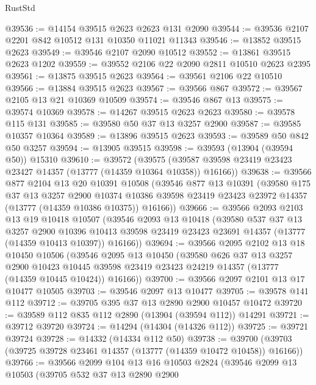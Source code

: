 \begin{lexlean}{RustStd}
\begin{coremodule}
@39536 := @14154 @39515 @2623 @2623 @131 @2090
@39544 := @39536 @2107 @2201 @842 @10512 @131 @10350 @11021 @11343
@39546 := @13852 @39515 @2623
@39549 := @39546 @2107 @2090 @10512
@39552 := @13861 @39515 @2623 @1202
@39559 := @39552 @2106 @22 @2090 @2811 @10510 @2623 @2395
@39561 := @13875 @39515 @2623
@39564 := @39561 @2106 @22 @10510
@39566 := @13884 @39515 @2623
@39567 := @39566 @867
@39572 := @39567 @2105 @13 @21 @10369 @10509
@39574 := @39546 @867 @13
@39575 := @39574 @10369
@39578 := @14267 @39515 @2623 @2623
@39580 := @39578 @115 @131
@39585 := @39580 @50 @37 @13 @3257 @2900
@39587 := @39585 @10357 @10364
@39589 := @13896 @39515 @2623
@39593 := @39589 @50 @842 @50 @3257
@39594 := @13905 @39515
@39598 := @39593 (@13904 (@39594 @50)) @15310
@39610 := @39572
    (@39575 (@39587 @39598 @23419 @23423 @23427 @14357 (@13777 (@14359 @10364 @10358)) @16166))
@39638 := @39566
    @877
    @2104
    @13
    @20
    @10391
    @10508
    (@39546
      @877
      @13
      @10391
      (@39580
        @175
        @37
        @13
        @3257
        @2900
        @10374
        @10386
        @39598
        @23419
        @23423
        @23972
        @14357
        (@13777 (@14359 @10386 @10375))
        @16166))
@39666 := @39566
    @2093
    @2103
    @13
    @19
    @10418
    @10507
    (@39546
      @2093
      @13
      @10418
      (@39580
        @537
        @37
        @13
        @3257
        @2900
        @10396
        @10413
        @39598
        @23419
        @23423
        @23691
        @14357
        (@13777 (@14359 @10413 @10397))
        @16166))
@39694 := @39566
    @2095
    @2102
    @13
    @18
    @10450
    @10506
    (@39546
      @2095
      @13
      @10450
      (@39580
        @626
        @37
        @13
        @3257
        @2900
        @10423
        @10445
        @39598
        @23419
        @23423
        @24219
        @14357
        (@13777 (@14359 @10445 @10424))
        @16166))
@39700 := @39566 @2097 @2101 @13 @17 @10477 @10505
@39703 := @39546 @2097 @13 @10477
@39705 := @39578 @141 @112
@39712 := @39705 @395 @37 @13 @2890 @2900 @10457 @10472
@39720 := @39589 @112 @835 @112 @2890 (@13904 (@39594 @112)) @14291
@39721 := @39712 @39720
@39724 := @14294 (@14304 (@14326 @112))
@39725 := @39721 @39724
@39728 := @14332 (@14334 @112 @50)
@39738 := @39700 (@39703 (@39725 @39728 @23461 @14357 (@13777 (@14359 @10472 @10458)) @16166))
@39766 := @39566
    @2099
    @104
    @13
    @16
    @10503
    @2824
    (@39546
      @2099
      @13
      @10503
      (@39705
        @532
        @37
        @13
        @2890
        @2900

\end{coremodule}
\end{lexlean}
